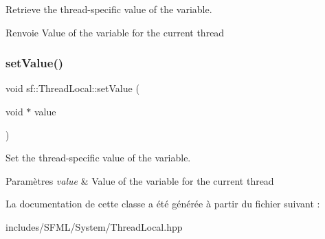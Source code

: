 Retrieve the thread-\/specific value of the variable. 

\begin{DoxyReturn}{Renvoie}
Value of the variable for the current thread 
\end{DoxyReturn}
\mbox{\label{classsf_1_1ThreadLocal_ab7e334c83d77644a8e67ee31c3230007}} 
\subsubsection{\texorpdfstring{set\+Value()}{setValue()}}
{\footnotesize\ttfamily void sf\+::\+Thread\+Local\+::set\+Value (\begin{DoxyParamCaption}\item[{void $\ast$}]{value }\end{DoxyParamCaption})}



Set the thread-\/specific value of the variable. 


\begin{DoxyParams}{Paramètres}
{\em value} & Value of the variable for the current thread \\
\hline
\end{DoxyParams}


La documentation de cette classe a été générée à partir du fichier suivant \+:\begin{DoxyCompactItemize}
\item 
includes/\+S\+F\+M\+L/\+System/Thread\+Local.\+hpp\end{DoxyCompactItemize}

